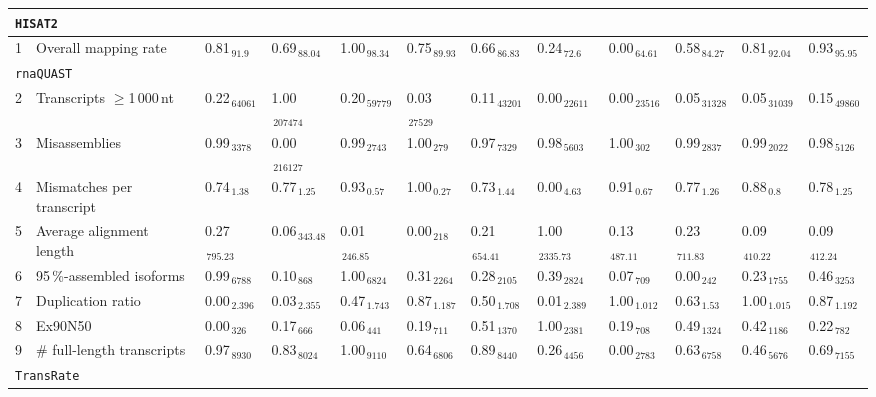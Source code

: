 \documentclass{scrartcl}
\begin{document}
\begin{landscape}
\begin{table}
\begin{scriptsize}
\begin{tabular}{llllllllllll}
\multicolumn{11}{l}{\texttt{HISAT2}}\\ 
\midrule
1 & Overall mapping rate  & 0.81$_{\,91.9}$ & 0.69$_{\,88.04}$ & 1.00$_{\,98.34}$ & 0.75$_{\,89.93}$ & 0.66$_{\,86.83}$ & 0.24$_{\,72.6}$ & 0.00$_{\,64.61}$ & 0.58$_{\,84.27}$ & 0.81$_{\,92.04}$ & 0.93$_{\,95.95}$ \\\midrule
\multicolumn{11}{l}{\texttt{rnaQUAST}}\\ 
\midrule
2 & Transcripts $\geq$1\,000\,nt  & 0.22$_{\,64061}$ & 1.00$_{\,207474}$ & 0.20$_{\,59779}$ & 0.03$_{\,27529}$ & 0.11$_{\,43201}$ & 0.00$_{\,22611}$ & 0.00$_{\,23516}$ & 0.05$_{\,31328}$ & 0.05$_{\,31039}$ & 0.15$_{\,49860}$ \\3 & Misassemblies  & 0.99$_{\,3378}$ & 0.00$_{\,216127}$ & 0.99$_{\,2743}$ & 1.00$_{\,279}$ & 0.97$_{\,7329}$ & 0.98$_{\,5603}$ & 1.00$_{\,302}$ & 0.99$_{\,2837}$ & 0.99$_{\,2022}$ & 0.98$_{\,5126}$ \\4 & Mismatches per transcript  & 0.74$_{\,1.38}$ & 0.77$_{\,1.25}$ & 0.93$_{\,0.57}$ & 1.00$_{\,0.27}$ & 0.73$_{\,1.44}$ & 0.00$_{\,4.63}$ & 0.91$_{\,0.67}$ & 0.77$_{\,1.26}$ & 0.88$_{\,0.8}$ & 0.78$_{\,1.25}$ \\5 & Average alignment length  & 0.27$_{\,795.23}$ & 0.06$_{\,343.48}$ & 0.01$_{\,246.85}$ & 0.00$_{\,218}$ & 0.21$_{\,654.41}$ & 1.00$_{\,2335.73}$ & 0.13$_{\,487.11}$ & 0.23$_{\,711.83}$ & 0.09$_{\,410.22}$ & 0.09$_{\,412.24}$ \\6 & 95\,\%-assembled isoforms  & 0.99$_{\,6788}$ & 0.10$_{\,868}$ & 1.00$_{\,6824}$ & 0.31$_{\,2264}$ & 0.28$_{\,2105}$ & 0.39$_{\,2824}$ & 0.07$_{\,709}$ & 0.00$_{\,242}$ & 0.23$_{\,1755}$ & 0.46$_{\,3253}$ \\7 & Duplication ratio  & 0.00$_{\,2.396}$ & 0.03$_{\,2.355}$ & 0.47$_{\,1.743}$ & 0.87$_{\,1.187}$ & 0.50$_{\,1.708}$ & 0.01$_{\,2.389}$ & 1.00$_{\,1.012}$ & 0.63$_{\,1.53}$ & 1.00$_{\,1.015}$ & 0.87$_{\,1.192}$ \\\midrule
8 & Ex90N50  & 0.00$_{\,326}$ & 0.17$_{\,666}$ & 0.06$_{\,441}$ & 0.19$_{\,711}$ & 0.51$_{\,1370}$ & 1.00$_{\,2381}$ & 0.19$_{\,708}$ & 0.49$_{\,1324}$ & 0.42$_{\,1186}$ & 0.22$_{\,782}$ \\9 & \# full-length transcripts  & 0.97$_{\,8930}$ & 0.83$_{\,8024}$ & 1.00$_{\,9110}$ & 0.64$_{\,6806}$ & 0.89$_{\,8440}$ & 0.26$_{\,4456}$ & 0.00$_{\,2783}$ & 0.63$_{\,6758}$ & 0.46$_{\,5676}$ & 0.69$_{\,7155}$ \\\midrule
\multicolumn{11}{l}{\texttt{TransRate}}\\ 
\midrule

\end{tabular}
\end{scriptsize}
\end{table}
\end{landscape}
\end{document}
